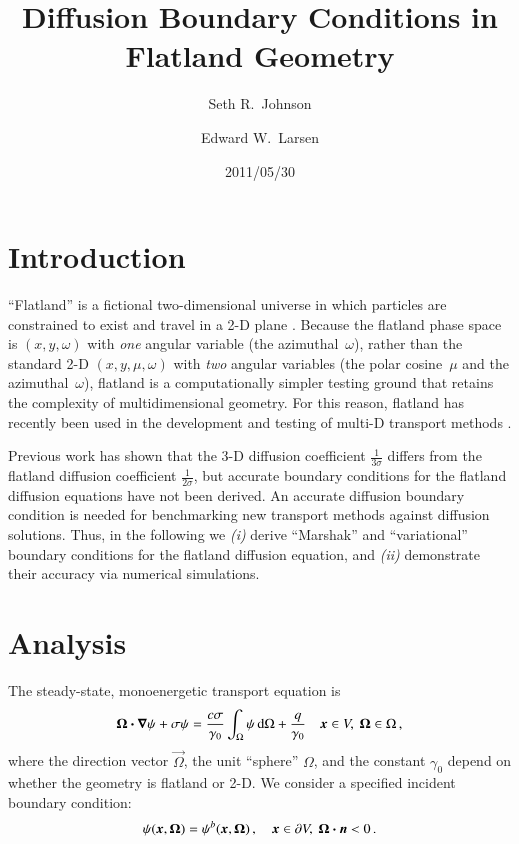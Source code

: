 \documentclass{anstrans}
\title{Diffusion Boundary Conditions in Flatland Geometry}
\author{Seth R.~Johnson \and Edward W.~Larsen}
\institute{Department of Nuclear Engineering \& Radiological Sciences, University of Michigan, Ann Arbor, MI, 48109}
\date{2011/05/30}
\begin{document}
\section{Introduction}
``Flatland'' is a fictional two-dimensional universe in which particles are
constrained to exist and
travel in a 2-D plane \cite{Asa2008}. Because the flatland phase space is
$(x,y,\omega)$ with \emph{one} angular variable (the azimuthal~$\omega$),
rather than the
standard 2-D $(x,y,\mu,\omega)$ with \emph{two} angular variables (the
polar cosine~$\mu$ and the azimuthal~$\omega$),
flatland is a computationally simpler testing ground that retains the
complexity of multidimensional geometry. For this reason, flatland has recently
been used in the development and testing of multi-D transport methods
\cite{Lar2009c,Joh2011,Tra2011}.

Previous work has shown that the 3-D diffusion coefficient
$\frac{1}{3\sigma}$ differs from the flatland diffusion coefficient
$\frac{1}{2\sigma}$, but accurate boundary conditions for the flatland
diffusion equations have not been derived. An accurate diffusion
boundary condition is needed for benchmarking new transport methods against
diffusion solutions. Thus, in the following we \textsl{(i)} derive ``Marshak''
and ``variational'' boundary conditions for the flatland diffusion equation,
and \textsl{(ii)} demonstrate their accuracy via numerical
simulations.

\section{Analysis}
The steady-state, monoenergetic transport equation is
\begin{equation}\label{eq:generalTransport}
  \bm{\Omega}\bm{\cdot} \bm{\nabla} \psi + \sigma \psi
  = \frac{c \sigma}{\gamma_0} \int_{\Omega} \psi \mathop{}\!\mathrm{d}\Omega + \frac{q}{\gamma_0}
  \quad \bm{x}\in V,\ \bm{\Omega}\in \Omega \,,
\end{equation}
where the direction vector $\vec{\Omega}$, the unit ``sphere'' $\Omega$, and
the constant $\gamma_0$ depend on whether the geometry
is flatland or 2-D. We consider a specified incident boundary condition:
\begin{equation} \label{eq:ssBndy}
  \psi(\bm{x}, \bm{\Omega}) = \psi^b(\bm{x}, \bm{\Omega})\,,
  \quad \bm{x}\in \partial V,\ \bm{\Omega} \bm{\cdot} \bm{n} < 0\,.
\end{equation}
\end{document}
